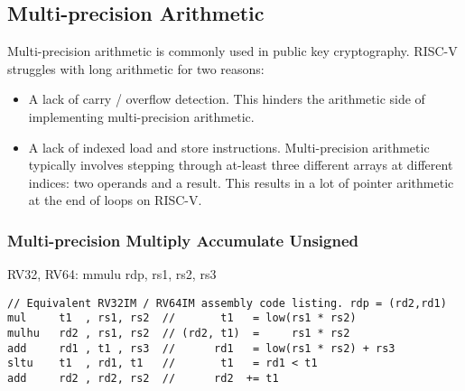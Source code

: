 
\subsection{Multi-precision Arithmetic}

Multi-precision arithmetic is commonly used in public key cryptography.
RISC-V struggles with long arithmetic for two reasons:

\begin{itemize}
\item A lack of carry / overflow detection. This hinders the arithmetic
    side of implementing multi-precision arithmetic.

\item A lack of indexed load and store instructions.
    Multi-precision arithmetic typically involves stepping through
    at-least three different arrays at different indices: two operands
    and a result.
    This results in a lot of pointer arithmetic at the end of loops
    on RISC-V.
\end{itemize}



\subsubsection{Multi-precision Multiply Accumulate Unsigned}

\begin{cryptoisa}
RV32, RV64:
    mmulu   rdp, rs1, rs2, rs3
\end{cryptoisa}

\begin{lstlisting}[]
// Equivalent RV32IM / RV64IM assembly code listing. rdp = (rd2,rd1)
mul     t1  , rs1, rs2  //       t1   = low(rs1 * rs2)
mulhu   rd2 , rs1, rs2  // (rd2, t1)  =     rs1 * rs2
add     rd1 , t1 , rs3  //      rd1   = low(rs1 * rs2) + rs3
sltu    t1  , rd1, t1   //       t1   = rd1 < t1
add     rd2 , rd2, rs2  //      rd2  += t1
\end{lstlisting}

